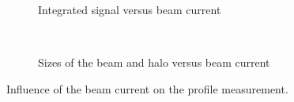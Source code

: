 \begin{figure}[!ht]
  \begin{subfigure}[t]{0.5\textwidth}
    
    \caption{Integrated signal versus beam current}
    \label{}
  \end{subfigure}
  ~
  \begin{subfigure}[t]{0.5\textwidth}
    
    \caption{Sizes of the beam and halo versus beam current}
    \label{}
  \end{subfigure}
  \caption[Influence of the beam current on the profile measurement.]{Influence of the beam current on the profile measurement.}
  \label{chap4:current_sweep}
\end{figure}
